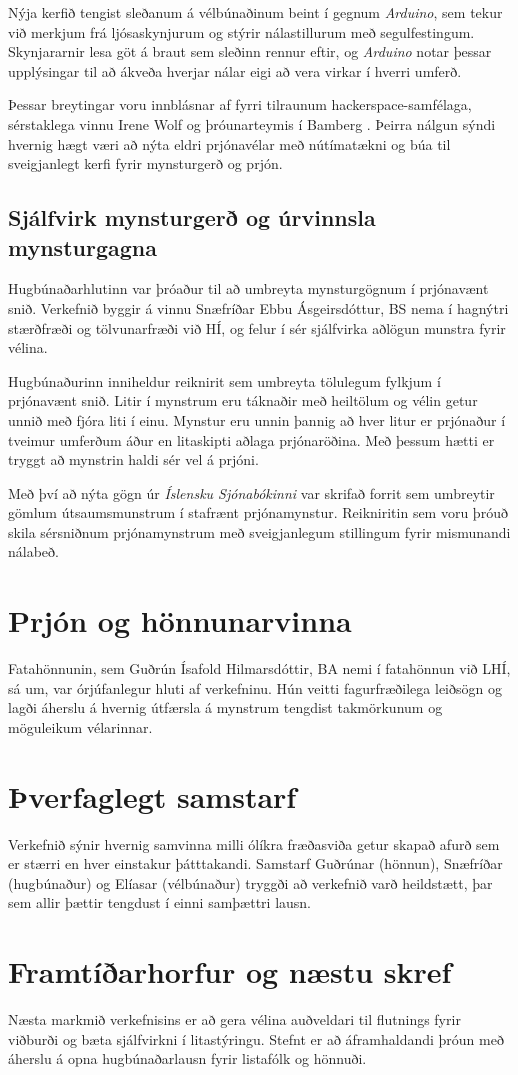 \documentclass[a4paper,12pt]{article}
\begin{document}
Nýja kerfið tengist sleðanum á vélbúnaðinum beint í gegnum \emph{Arduino}, sem tekur
við merkjum frá ljósaskynjurum og stýrir nálastillurum með segulfestingum.
Skynjararnir lesa göt á braut sem sleðinn rennur eftir, og \emph{Arduino} notar þessar
upplýsingar til að ákveða hverjar nálar eigi að vera virkar í hverri umferð. 

Þessar breytingar voru innblásnar af fyrri tilraunum hackerspace-samfélaga,
sérstaklega vinnu Irene Wolf og þróunarteymis í Bamberg \cite{wolf, bamberg}.
Þeirra nálgun sýndi hvernig hægt væri að nýta eldri prjónavélar með nútímatækni og
búa til sveigjanlegt kerfi fyrir mynsturgerð og prjón.

\subsection{Sjálfvirk mynsturgerð og úrvinnsla mynsturgagna}
Hugbúnaðarhlutinn var þróaður til að umbreyta mynsturgögnum í prjónavænt snið.
Verkefnið byggir á vinnu Snæfríðar Ebbu Ásgeirsdóttur, BS nema í hagnýtri stærðfræði
og tölvunarfræði við HÍ, og felur í sér sjálfvirka aðlögun munstra fyrir vélina.

Hugbúnaðurinn inniheldur reiknirit sem umbreyta tölulegum fylkjum í prjónavænt snið.
Litir í mynstrum eru táknaðir með heiltölum og vélin getur unnið með fjóra liti í einu.
Mynstur eru unnin þannig að hver litur er prjónaður í tveimur umferðum áður en litaskipti
aðlaga prjónaröðina. Með þessum hætti er tryggt að mynstrin haldi sér vel á prjóni.

Með því að nýta gögn úr \emph{Íslensku Sjónabókinni} \cite{sjonabok} var skrifað forrit
sem umbreytir gömlum útsaumsmunstrum í stafrænt prjónamynstur. Reikniritin sem voru þróuð
skila sérsniðnum prjónamynstrum með sveigjanlegum stillingum fyrir mismunandi nálabeð.

\section{Prjón og hönnunarvinna}
Fatahönnunin, sem Guðrún Ísafold Hilmarsdóttir, BA nemi í fatahönnun við LHÍ, sá um,
var órjúfanlegur hluti af verkefninu. Hún veitti fagurfræðilega leiðsögn og lagði áherslu á
hvernig útfærsla á mynstrum tengdist takmörkunum og möguleikum vélarinnar.

\section{Þverfaglegt samstarf}
Verkefnið sýnir hvernig samvinna milli ólíkra fræðasviða getur skapað afurð sem er
stærri en hver einstakur þátttakandi. Samstarf Guðrúnar (hönnun), Snæfríðar (hugbúnaður)
og Elíasar (vélbúnaður) tryggði að verkefnið varð heildstætt, þar sem allir þættir
tengdust í einni samþættri lausn.

\section{Framtíðarhorfur og næstu skref}
Næsta markmið verkefnisins er að gera vélina auðveldari til flutnings fyrir viðburði og bæta sjálfvirkni í litastýringu.
Stefnt er að áframhaldandi þróun með áherslu á opna hugbúnaðarlausn fyrir listafólk og hönnuði.

\printbibliography
\end{document}
